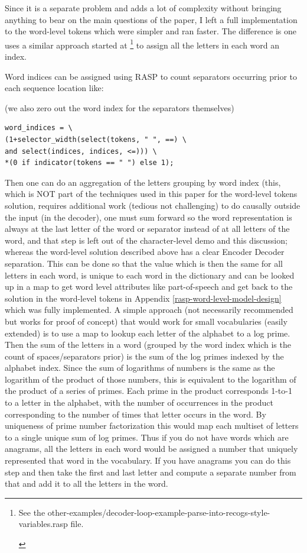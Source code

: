 \documentclass[11pt]{article}
\begin{document}
Since it is a separate problem and adds a lot of complexity without bringing anything to bear on the main questions of the paper, I left a full implementation to the word-level tokens which were simpler and ran faster. The difference is one uses a similar approach started at \footnote{\begin{footnotesize}See the other-examples/decoder-loop-example-parse-into-recogs-style-variables.rasp file.\end{footnotesize}} to assign all the letters in each word an index. 

Word indices can be assigned using RASP to count separators occurring prior to each sequence location like:

(we also zero out the word index for the separators themselves)

\begin{tiny}
\begin{verbatim}
word_indices = \
(1+selector_width(select(tokens, " ", ==) \
and select(indices, indices, <=))) \
*(0 if indicator(tokens == " ") else 1);
\end{verbatim}
\end{tiny}

Then one can do an aggregation of the letters grouping by word index (this, which is NOT part of the techniques used in this paper for the word-level tokens solution, requires additional work (tedious not challenging) to do causally outside the input (in the decoder), one must sum forward so the word representation is always at the last letter of the word or separator instead of at all letters of the word, and that step is left out of the character-level demo and this discussion; whereas the word-level solution described above has a clear Encoder Decoder separation. This can be done so that the value which is then the same for all letters in each word, is unique to each word in the dictionary and can be looked up in a map to get word level attributes like part-of-speech and get back to the solution in the word-level tokens in Appendix \ref{rasp-word-level-model-design} which was fully implemented. A simple approach (not necessarily recommended but works for proof of concept) that would work for small vocabularies (easily extended) is to use a map to lookup each letter of the alphabet to a log prime. Then the sum of the letters in a word (grouped by the word index which is the count of spaces/separators prior) is the sum of the log primes indexed by the alphabet index. Since the sum of logarithms of numbers is the same as the logarithm of the product of those numbers, this is equivalent to the logarithm of the product of a series of primes. Each prime in the product corresponds 1-to-1 to a letter in the alphabet, with the number of occurrences in the product corresponding to the number of times that letter occurs in the word. By uniqueness of prime number factorization this would map each multiset of letters to a single unique sum of log primes. Thus if you do not have words which are anagrams, all the letters in each word would be assigned a number that uniquely represented that word in the vocabulary. If you have anagrams you can do this step and then take the first and last letter and compute a separate number from that and add it to all the letters in the word.
\end{document}
